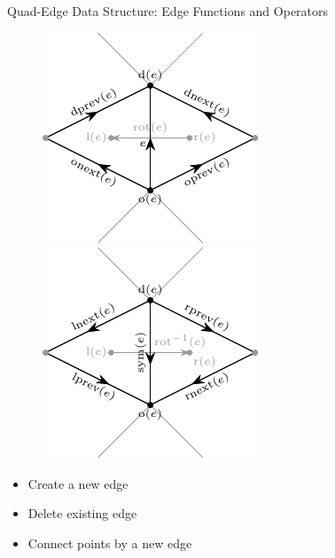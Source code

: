 \documentclass[aspectratio=169,fleqn]{beamer}
\begin{document}
  \begin{frame}{Quad-Edge Data Structure: Edge Functions and Operators}
    \begin{figure}
      \center
      \includegraphics[height=0.6\textheight]{figures/quad-edge-vertex-functions.pdf}
      \hspace{2em}
      \includegraphics[height=0.6\textheight]{figures/quad-edge-face-functions.pdf}
    \end{figure}
    \onslide<+->
    \begin{itemize}
      \item<+-> Create a new edge
      \item<+-> Delete existing edge
      \item<+-> Connect points by a new edge
    \end{itemize}
  \end{frame}
\end{document}
